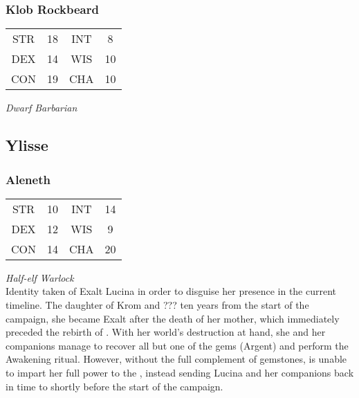 \subsubsection{Klob Rockbeard}
\label{people:daniel}
\begin{center}
\begin{tabular}{c c|c c}
STR & 18 & INT & 8\\
DEX & 14 & WIS & 10 \\
CON & 19 & CHA & 10 \end{tabular}\end{center}
\textit{Dwarf Barbarian}\\


\subsection{Ylisse}

\subsubsection{Aleneth}
\label{people:bends}
\begin{center}
\begin{tabular}{c c|c c}
STR & 10 & INT & 14\\
DEX & 12 & WIS & 9 \\
CON & 14 & CHA & 20 \end{tabular}\end{center}
\textit{Half-elf Warlock}\\

Identity taken of Exalt Lucina in order to disguise her presence in the current timeline. The daughter of Krom and ??? ten years from the start of the campaign, she became Exalt after the death of her mother, which immediately preceded the rebirth of . With her world's destruction at hand, she and her companions manage to recover all but one of the gems (Argent) and perform the Awakening ritual. However, without the full complement of gemstones,  is unable to impart her full power to the , instead sending Lucina and her companions back in time to shortly before the start of the campaign. 

